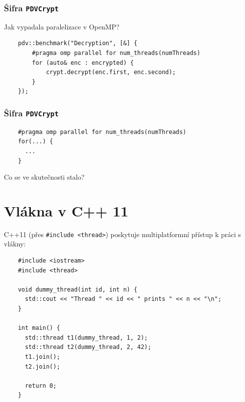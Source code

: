 \documentclass[usenames,dvipsnames,9pt]{beamer}
\begin{document}
{
\begin{frame}[fragile]
  \frametitle{Šifra \texttt{PDVCrypt}}
  Jak vypadala paralelizace v OpenMP?

    \begin{verbatim}
    pdv::benchmark("Decryption", [&] {
        #pragma omp parallel for num_threads(numThreads)
        for (auto& enc : encrypted) {
            crypt.decrypt(enc.first, enc.second);
        }
    });
    \end{verbatim}
    
\end{frame}
}

\begin{frame}[fragile]
  \frametitle{Šifra \texttt{PDVCrypt}}
  \begin{verbatim}
    #pragma omp parallel for num_threads(numThreads)
    for(...) {
      ...
    }
  \end{verbatim}
  
  \vspace{2em}

  \hfill\Large Co se ve skutečnosti stalo?    
\end{frame}

\section{Vlákna v C++ 11}

\begin{frame}[fragile]
  C++11 (přes \texttt{#include <thread>}) poskytuje multiplatformní přístup k práci s vlákny:

  \vspace{1em}

  \begin{verbatim}
    #include <iostream>
    #include <thread>

    void dummy_thread(int id, int n) {
      std::cout << "Thread " << id << " prints " << n << "\n";
    }

    int main() {
      std::thread t1(dummy_thread, 1, 2);
      std::thread t2(dummy_thread, 2, 42);
      t1.join();
      t2.join();

      return 0;
    }
  \end{verbatim}
\end{frame}
\end{document}
